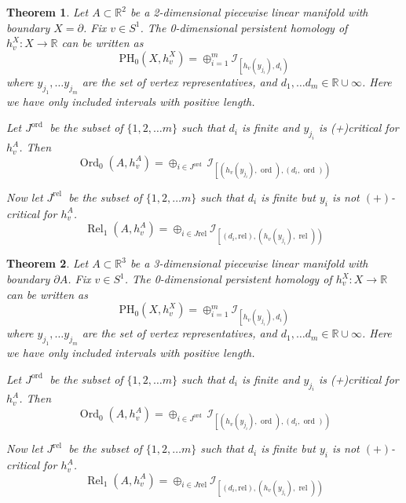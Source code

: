 \documentclass[a4paper]{article}
\theoremstyle{theorem}
\newtheorem{theorem}{Theorem}[section]
\theoremstyle{definition}
\theoremstyle{remark}
\theoremstyle{gremark}
\theoremstyle{discussion}
\theoremstyle{notation}
\begin{document}
	
	\begin{theorem}
		Let $A \subset \mathbb{R}^2$ be a 2-dimensional piecewise linear manifold with boundary $X=\partial$. Fix $v \in S^1$. The 0-dimensional persistent homology of $h_v^X: X \rightarrow \mathbb{R}$ can be written as
		$$
		\mathrm{PH}_0\left(X, h_v^X\right)=\oplus_{i=1}^m \mathcal{I}_{\left[h_v\left(y_{j_i}\right), d_i\right)}
		$$
		where $y_{j_1}, \ldots y_{j_m}$ are the set of vertex representatives, and $d_1, \ldots d_m \in \mathbb{R} \cup \infty$. Here we have only included intervals with positive length.
		
		Let $J^{\text {ord }}$ be the subset of $\{1,2, \ldots m\}$ such that $d_i$ is finite and $y_{j_i}$ is (+)critical for $h_v^A$. Then
		$$
		\operatorname{Ord}_0\left(A, h_v^A\right)=\oplus_{i \in J^{\text {ord }}} \mathcal{I}_{\left[\left(h_v\left(y_{j_i}\right), \text { ord }\right),\left(d_i, \text { ord }\right)\right)}
		$$
		
		Now let $J^{\text {rel }}$ be the subset of $\{1,2, \ldots m\}$ such that $d_i$ is finite but $y_i$ is not $(+)$-critical for $h_v^A$.
		$$
		\operatorname{Rel}_1\left(A, h_v^A\right)=\oplus_{i \in J \mathrm{rel}} \mathcal{I}_{\left[\left(d_i, \mathrm{rel}\right),\left(h_v\left(y_{j_i}\right), \text { rel }\right)\right)}
		$$
	\end{theorem}
	
	\begin{theorem}
			Let $A \subset \mathbb{R}^3$ be a 3-dimensional piecewise linear manifold with boundary $\partial A$. Fix $v \in S^1$. The 0-dimensional persistent homology of $h_v^X: X \rightarrow \mathbb{R}$ can be written as
		$$
		\mathrm{PH}_0\left(X, h_v^X\right)=\oplus_{i=1}^m \mathcal{I}_{\left[h_v\left(y_{j_i}\right), d_i\right)}
		$$
		where $y_{j_1}, \ldots y_{j_m}$ are the set of vertex representatives, and $d_1, \ldots d_m \in \mathbb{R} \cup \infty$. Here we have only included intervals with positive length.
		
		Let $J^{\text {ord }}$ be the subset of $\{1,2, \ldots m\}$ such that $d_i$ is finite and $y_{j_i}$ is (+)critical for $h_v^A$. Then
		$$
		\operatorname{Ord}_0\left(A, h_v^A\right)=\oplus_{i \in J^{\text {ord }}} \mathcal{I}_{\left[\left(h_v\left(y_{j_i}\right), \text { ord }\right),\left(d_i, \text { ord }\right)\right)}
		$$
		
		Now let $J^{\text {rel }}$ be the subset of $\{1,2, \ldots m\}$ such that $d_i$ is finite but $y_i$ is not $(+)$-critical for $h_v^A$.
		$$
		\operatorname{Rel}_1\left(A, h_v^A\right)=\oplus_{i \in J \mathrm{rel}} \mathcal{I}_{\left[\left(d_i, \mathrm{rel}\right),\left(h_v\left(y_{j_i}\right), \text { rel }\right)\right)}
		$$
	\end{theorem}
\end{document}
